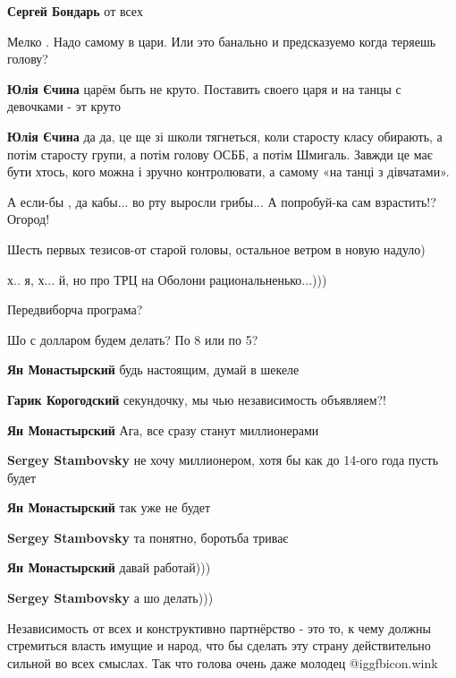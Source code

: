 \begin{itemize}
\textbf{Сергей Бондарь} от всех

Мелко . Надо самому в цари.
Или это банально и предсказуемо когда теряешь голову?

\begin{itemize} %
\textbf{Юлія Єчина} царём быть не круто. Поставить своего царя и на танцы с девочками - эт круто

\textbf{Юлія Єчина} да да, це ще зі школи тягнеться, коли старосту класу обирають, а потім старосту групи, а потім голову ОСББ, а потім Шмигаль.
Завжди це має бути хтось, кого можна і зручно контролювати, а самому «на танці з дівчатами».
\end{itemize} %

А если-бы , да кабы... во рту выросли грибы... А попробуй-ка сам взрастить!? Огород!

Шесть первых тезисов-от старой головы, остальное ветром в новую надуло)

х.. я, х... й, но про ТРЦ на Оболони рациональненько...)))

Передвиборча програма?

Шо с долларом будем делать? По 8 или по 5?

\begin{itemize} %
\textbf{Ян Монастырский} будь настоящим, думай в шекеле

\textbf{Гарик Корогодский} секундочку, мы чью независимость объявляем?!

\textbf{Ян Монастырский} Ага, все сразу станут миллионерами

\textbf{Sergey Stambovsky} не хочу миллионером, хотя бы как до 14-ого года пусть будет

\textbf{Ян Монастырский} так уже не будет

\textbf{Sergey Stambovsky} та понятно, боротьба триває

\textbf{Ян Монастырский} давай работай)))

\textbf{Sergey Stambovsky} а шо делать)))
\end{itemize} %


Независимость от всех и конструктивно партнёрство - это то, к чему должны
стремиться власть имущие и народ, что бы сделать эту страну действительно
сильной во всех смыслах. Так что голова очень даже молодец @igg{fbicon.wink} 


\end{itemize}
